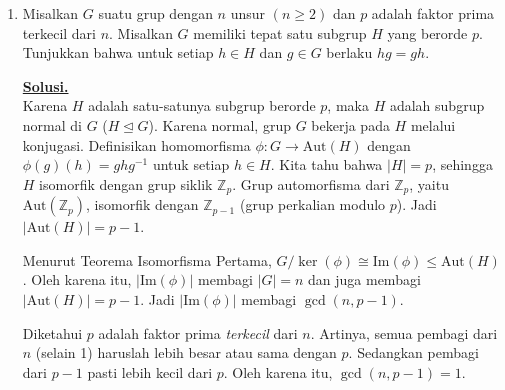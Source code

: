 \documentclass[12pt,twoside]{article}
\newenvironment{solution}
{
	\par\noindent\textbf{\underline{Solusi.}}\\
}
{
	\par
}
\begin{document}
\begin{enumerate}
\begin{solution}
          Secara lebih formal, dalam basis terurut $\{v_n, v_{n-1}, \dots, v_1\}$ matriksnya segitiga.
          Oleh karena itu, nilai-nilai eigen dari $A$ adalah elemen-elemen diagonal tersebut, yaitu $c_1, c_2, \dots, c_n$.
        \end{solution}
  \item Misalkan $G$ suatu grup dengan $n$ unsur $(n\geq 2)$ dan $p$ adalah faktor prima terkecil dari $n$. Misalkan $G$ memiliki tepat satu subgrup $H$ yang berorde $p$. Tunjukkan bahwa untuk setiap $h\in H$ dan $g\in G$ berlaku $hg=gh$.
        \begin{solution}
          Karena $H$ adalah satu-satunya subgrup berorde $p$, maka $H$ adalah subgrup normal di $G$ ($H \trianglelefteq G$).
          Karena normal, grup $G$ bekerja pada $H$ melalui konjugasi. Definisikan homomorfisma $\phi: G \to \text{Aut}(H)$ dengan $\phi(g)(h) = ghg^{-1}$ untuk setiap $h \in H$.
          Kita tahu bahwa $|H| = p$, sehingga $H$ isomorfik dengan grup siklik $\mathbb{Z}_p$.
          Grup automorfisma dari $\mathbb{Z}_p$, yaitu $\text{Aut}(\mathbb{Z}_p)$, isomorfik dengan $\mathbb{Z}_{p-1}$ (grup perkalian modulo $p$).
          Jadi $|\text{Aut}(H)| = p-1$.

          Menurut Teorema Isomorfisma Pertama, $G/\ker(\phi) \cong \text{Im}(\phi) \le \text{Aut}(H)$.
          Oleh karena itu, $|\text{Im}(\phi)|$ membagi $|G|=n$ dan juga membagi $|\text{Aut}(H)|=p-1$.
          Jadi $|\text{Im}(\phi)|$ membagi $\gcd(n, p-1)$.

          Diketahui $p$ adalah faktor prima \textit{terkecil} dari $n$.
          Artinya, semua pembagi dari $n$ (selain 1) haruslah lebih besar atau sama dengan $p$.
          Sedangkan pembagi dari $p-1$ pasti lebih kecil dari $p$.
          Oleh karena itu, $\gcd(n, p-1) = 1$.


\end{solution}
\end{enumerate}
\end{document}
